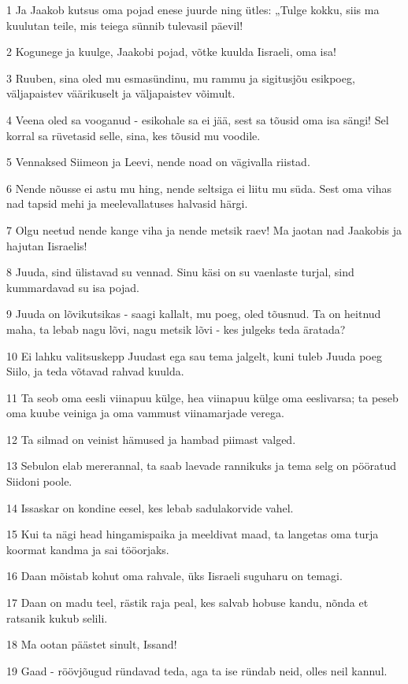 \par 1 Ja Jaakob kutsus oma pojad enese juurde ning ütles: „Tulge kokku, siis ma kuulutan teile, mis teiega sünnib tulevasil päevil!
\par 2 Kogunege ja kuulge, Jaakobi pojad, võtke kuulda Iisraeli, oma isa!
\par 3 Ruuben, sina oled mu esmasündinu, mu rammu ja sigitusjõu esikpoeg, väljapaistev väärikuselt ja väljapaistev võimult.
\par 4 Veena oled sa vooganud - esikohale sa ei jää, sest sa tõusid oma isa sängi! Sel korral sa rüvetasid selle, sina, kes tõusid mu voodile.
\par 5 Vennaksed Siimeon ja Leevi, nende noad on vägivalla riistad.
\par 6 Nende nõusse ei astu mu hing, nende seltsiga ei liitu mu süda. Sest oma vihas nad tapsid mehi ja meelevallatuses halvasid härgi.
\par 7 Olgu neetud nende kange viha ja nende metsik raev! Ma jaotan nad Jaakobis ja hajutan Iisraelis!
\par 8 Juuda, sind ülistavad su vennad. Sinu käsi on su vaenlaste turjal, sind kummardavad su isa pojad.
\par 9 Juuda on lõvikutsikas - saagi kallalt, mu poeg, oled tõusnud. Ta on heitnud maha, ta lebab nagu lõvi, nagu metsik lõvi - kes julgeks teda äratada?
\par 10 Ei lahku valitsuskepp Juudast ega sau tema jalgelt, kuni tuleb Juuda poeg Siilo, ja teda võtavad rahvad kuulda.
\par 11 Ta seob oma eesli viinapuu külge, hea viinapuu külge oma eeslivarsa; ta peseb oma kuube veiniga ja oma vammust viinamarjade verega.
\par 12 Ta silmad on veinist hämused ja hambad piimast valged.
\par 13 Sebulon elab mererannal, ta saab laevade rannikuks ja tema selg on pööratud Siidoni poole.
\par 14 Issaskar on kondine eesel, kes lebab sadulakorvide vahel.
\par 15 Kui ta nägi head hingamispaika ja meeldivat maad, ta langetas oma turja koormat kandma ja sai tööorjaks.
\par 16 Daan mõistab kohut oma rahvale, üks Iisraeli suguharu on temagi.
\par 17 Daan on madu teel, rästik raja peal, kes salvab hobuse kandu, nõnda et ratsanik kukub selili.
\par 18 Ma ootan päästet sinult, Issand!
\par 19 Gaad - röövjõugud ründavad teda, aga ta ise ründab neid, olles neil kannul.
